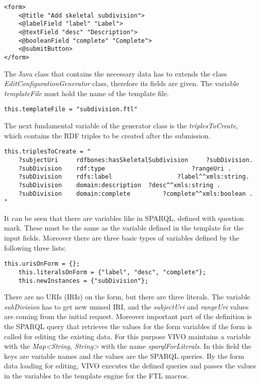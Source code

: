 \begin{lstlisting}[captionpos=b, caption= subdivision.ftl, label=skullJSON, belowskip=1em, aboveskip=2em,
basicstyle=\footnotesize,frame=single]
<form>
	<@title "Add skeletal subdivision">
	<@labelField "label" "Label">
	<@textField	"desc" "Description">
	<@booleanField "complete" "Complete">
	<@submitButton>
</form>	
\end{lstlisting}

The Java class that contains the necessary data has to extends the class \textit{EditConfigurationGenerator} class, therefore its fields are given. The variable \textit{templateFile} must hold the name of the template file.

\begin{lstlisting}[captionpos=b, caption= Form defintion in Java, label=skullJSON, belowskip=1em, aboveskip=2em,
basicstyle=\footnotesize,frame=single]
	this.templateFile = "subdivision.ftl"
\end{lstlisting}

The next fundamental variable of the generator class is the \textit{triplesToCreate}, which contains the RDF triples to be created after the submission.

\begin{lstlisting}[captionpos=b, caption= RDF Triples to create, label=skullJSON, belowskip=1em, aboveskip=2em,
basicstyle=\footnotesize,frame=single]
this.triplesToCreate = "
	?subjectUri		rdfbones:hasSkeletalSubdivision		?subDivision.
	?subDivision	rdf:type						?rangeUri .
	?subDivision	rdfs:label					?label^^xmls:string.
	?subDivision	domain:description	?desc^^xmls:string .
	?subDivision	domain:complete			?complete^^xmls:boolean . "
\end{lstlisting}

It can be seen that there are variables like in SPARQL, defined with question mark. These must be the same as the variable defined in the template for the input fields. Moreover there are three basic types of variables defined by the following three lists:

\begin{lstlisting}[captionpos=b, caption= Variable type definition, label=skullJSON, belowskip=1em, aboveskip=2em,
basicstyle=\footnotesize,frame=single]
	this.urisOnForm = {};
	this.literalsOnForm	= {"label", "desc", "complete"};
	this.newInstances = {"subDivision"};
\end{lstlisting}

There are no URIs (IRIs) on the form, but there are three literals. The variable \textit{subDivision} has to get new unused IRI, and the \textit{subjectUri} and \textit{rangeUri} values are coming from the initial request. Moreover important part of the definition is the SPARQL query that retrieves the values for the form variables if the form is called for editing the existing data. For this purpose VIVO maintains a variable with the \textit{Map<String, String>} with the name \textit{sparqlForLiterals}. In this field the keys are variable names and the values are the SPARQL queries. By the form data loading for editing, VIVO executes the defined queries and passes the values in the variables to the template engine for the FTL macros.


